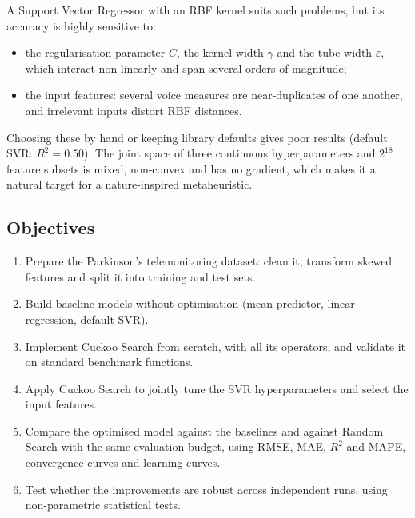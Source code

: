 \documentclass[12pt,a4paper]{article}
\numberwithin{equation}{section}
\numberwithin{table}{section}
\numberwithin{figure}{section}
\begin{document}
A Support Vector Regressor with an RBF kernel suits such problems, but its accuracy is highly sensitive to:
\begin{itemize}
  \item the regularisation parameter $C$, the kernel width $\gamma$ and the tube width $\varepsilon$, which interact non-linearly and span several orders of magnitude;
  \item the input features: several voice measures are near-duplicates of one another, and irrelevant inputs distort RBF distances.
\end{itemize}
Choosing these by hand or keeping library defaults gives poor results (default SVR: $R^2 = 0.50$). The joint space of three continuous hyperparameters and $2^{18}$ feature subsets is mixed, non-convex and has no gradient, which makes it a natural target for a nature-inspired metaheuristic.

\subsection{Objectives}
\begin{enumerate}
  \item Prepare the Parkinson's telemonitoring dataset: clean it, transform skewed features and split it into training and test sets.
  \item Build baseline models without optimisation (mean predictor, linear regression, default SVR).
  \item Implement Cuckoo Search from scratch, with all its operators, and validate it on standard benchmark functions.
  \item Apply Cuckoo Search to jointly tune the SVR hyperparameters and select the input features.
  \item Compare the optimised model against the baselines and against Random Search with the same evaluation budget, using RMSE, MAE, $R^2$ and MAPE, convergence curves and learning curves.
  \item Test whether the improvements are robust across independent runs, using non-parametric statistical tests.
\end{enumerate}
\end{document}
